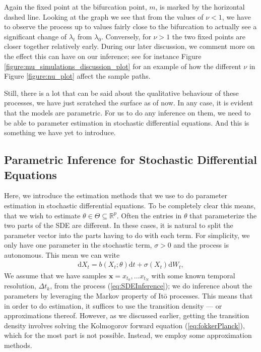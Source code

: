 Again the fixed point at the bifurcation point, $m$, is marked by the horizontal dashed line. Looking at the graph we see that from the values of $\nu < 1$, we have to observe the process up to values fairly close to the bifurcation to actually see a significant change of $\lambda_t$ from $\lambda_0$. Conversely, for $\nu>1$ the two fixed points are closer together relatively early. During our later discussion, we comment more on the effect this can have on our inference; see for instance Figure \ref{figure:mu_simulations_discussion_plot} for an example of how the different $\nu$ in Figure \ref{figure:nu_plot} affect the sample paths. 

Still, there is a lot that can be said about the qualitative behaviour of these processes, we have just scratched the surface as of now. In any case, it is evident that the models are parametric. For us to do any inference on them, we need to be able to parameter estimation in stochastic differential equations. And this is something we have yet to introduce.
\subsection{Parametric Inference for Stochastic Differential Equations}
Here, we introduce the estimation methods that we use to do parameter estimation in stochastic differential equations. To be completely clear this means, that we wish to estimate $\theta\in\Theta\subseteq\mathbb{R}^p$. Often the entries in $\theta$ that parameterize the two parts of the SDE are different. In these cases, it is natural to split the parameter vector into the parts having to do with each term. For simplicity, we only have one parameter in the stochastic term, $\sigma>0$ and the process is autonomous. This mean we can write
\begin{align}
    \mathrm{d}X_t = b(X_t; \theta)\mathrm{d}t + \sigma\left(X_t\right)\mathrm{d}W_t, \label{eq:SDEInference}
\end{align}
We assume that we have samples $\mathbf{x} = x_{t_0},\dots x_{t_N}$ with some known temporal resolution, $\Delta t_k$, from the process (\ref{eq:SDEInference}); we do inference about the parameters by leveraging the Markov property of Itō processes. This means that in order to do estimation, it suffices to use the transition density — or approximations thereof. However, as we discussed earlier, getting the transition density involves solving the Kolmogorov forward equation (\ref{eq:fokkerPlanck}), which for the most part is not possible. Instead, we employ some approximation methods.

